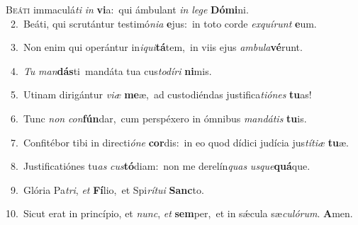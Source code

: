 \lettrine{\initial\textcolor{\initialcolor}{B}}{eáti} immaculá\textit{ti} \textit{in} \textbf{vi}\-a:~\star qui ámbulant \textit{in} \textit{le}\-\textit{ge} \textbf{Dó}\-\textbf{mi}ni.\\
{\numbfont\textcolor{\numbcolor}{~2.}}~Beáti, qui scrutántur testimó\-\textit{ni}\-\textit{a} \textbf{e}\-jus:~\star in toto corde \textit{ex}\-\textit{quí}\textit{runt} \textbf{e}\-um.\par
{\numbfont\textcolor{\numbcolor}{~3.}}~Non enim qui operántur in\-\textit{i}\-\textit{qui}\textbf{tá}tem,~\star in viis ejus \textit{am}\-\textit{bu}\textit{la}\textbf{vé}runt.\par
{\numbfont\textcolor{\numbcolor}{~4.}}~\textit{Tu} \textit{man}\-\textbf{dás}ti~\star mandáta tua cus\-\textit{to}\-\textit{dí}\textit{ri} \textbf{ni}\-mis.\par
{\numbfont\textcolor{\numbcolor}{~5.}}~Utinam dirigántur \textit{vi}\-\textit{æ} \textbf{me}\-æ,~\star ad custodiéndas justifica\-\textit{ti}\-\textit{ó}\textit{nes} \textbf{tu}\-as!\par
{\numbfont\textcolor{\numbcolor}{~6.}}~Tunc \textit{non} \textit{con}\-\textbf{fún}dar,~\star cum perspéxero in ómnibus \textit{man}\-\textit{dá}\textit{tis} \textbf{tu}\-is.\par
{\numbfont\textcolor{\numbcolor}{~7.}}~Confitébor tibi in directi\-\textit{ó}\-\textit{ne} \textbf{cor}\-dis:~\star in eo quod dídici judícia jus\-\textit{tí}\-\textit{ti}\textit{æ} \textbf{tu}\-æ.\par
{\numbfont\textcolor{\numbcolor}{~8.}}~Justificatiónes tu\textit{as} \textit{cus}\-\textbf{tó}diam:~\star non me derelín\textit{quas} \textit{us}\-\textit{que}\textbf{quá}que.\par
{\numbfont\textcolor{\numbcolor}{~9.}}~Glória Pa\-\textit{tri}\-, \textit{et} \textbf{Fí}\-lio,~\star et Spi\-\textit{rí}\-\textit{tu}\textit{i} \textbf{Sanc}\-to.\par
{\numbfont\textcolor{\numbcolor}{10.}}~Sicut erat in princípio, et \textit{nunc}\-, \textit{et} \textbf{sem}\-per,~\star et in sǽcula sæ\-\textit{cu}\-\textit{ló}\textit{rum}. \textbf{A}\-men.\par
